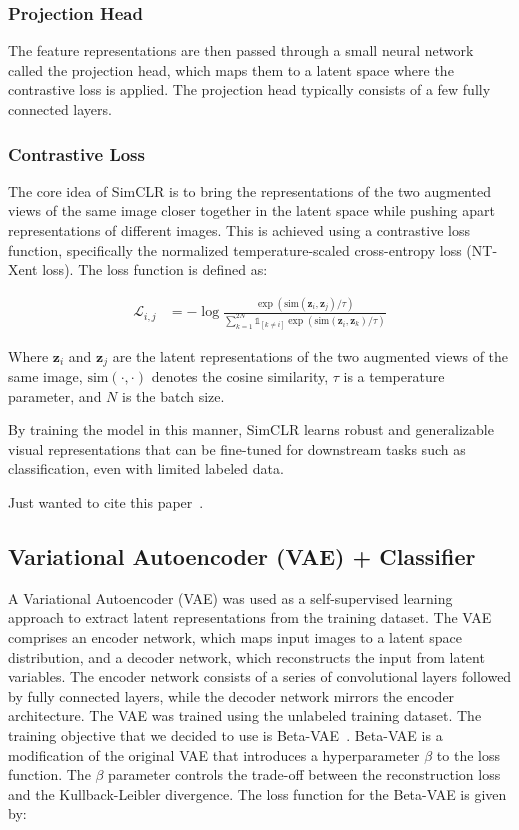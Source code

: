 \documentclass{article}
\begin{document}
\subsubsection{Projection Head}
The feature representations are then passed through a small neural network
called the projection head, which maps them to a latent space where the
contrastive loss is applied. The projection head typically consists of a few
fully connected layers.

\subsubsection{Contrastive Loss}
The core idea of SimCLR is to bring the representations of the two augmented
views of the same image closer together in the latent space while pushing apart
representations of different images. This is achieved using a contrastive loss
function, specifically the normalized temperature-scaled cross-entropy loss
(NT-Xent loss). The loss function is defined as:

\begin{align}
  \mathcal{L}_{i,j} & = -\log
  \frac{\exp(\text{sim}(\mathbf{z}_i, \mathbf{z}_j) / \tau)}{\sum_{k=1}^{2N}
  \mathbb{1}_{[k \neq i]} \exp(\text{sim}(\mathbf{z}_i, \mathbf{z}_k) / \tau)}
\end{align}

Where $\mathbf{z}_i$ and $\mathbf{z}_j$ are the latent representations of the
two augmented views of the same image, $\text{sim}(\cdot, \cdot)$ denotes the
cosine similarity, $\tau$ is a temperature parameter, and $N$ is the batch
size.

By training the model in this manner, SimCLR learns robust and generalizable
visual representations that can be fine-tuned for downstream tasks such as
classification, even with limited labeled data.

Just wanted to cite this paper~\cite{simclr}.

\subsection{Variational Autoencoder (VAE) + Classifier}

A Variational Autoencoder (VAE) was used as a self-supervised learning
approach to extract latent representations from the training dataset. The VAE
comprises an encoder network, which maps input images to a latent space
distribution, and a decoder network, which reconstructs the input from latent
variables. The encoder network consists of a series of convolutional layers
followed by fully connected layers, while the decoder network mirrors the
encoder architecture. The VAE was trained using the unlabeled training dataset.
The training objective that we decided to use is Beta-VAE~\cite{beta-vae}.
Beta-VAE is a modification of the original VAE that introduces a hyperparameter
$\beta$ to the loss function. The $\beta$ parameter controls the trade-off
between the reconstruction loss and the Kullback-Leibler divergence. The loss
function for the Beta-VAE is given by:
\end{document}
